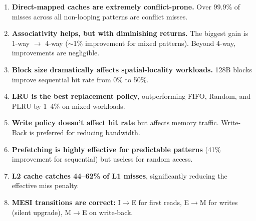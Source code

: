 \documentclass[12pt,a4paper]{article}
\begin{document}
\begin{enumerate}
    \item \textbf{Direct-mapped caches are extremely conflict-prone.} Over 99.9\% of misses across all non-looping patterns are conflict misses.
    \item \textbf{Associativity helps, but with diminishing returns.} The biggest gain is 1-way $\to$ 4-way ($\sim$1\% improvement for mixed patterns). Beyond 4-way, improvements are negligible.
    \item \textbf{Block size dramatically affects spatial-locality workloads.} 128B blocks improve sequential hit rate from 0\% to 50\%.
    \item \textbf{LRU is the best replacement policy}, outperforming FIFO, Random, and PLRU by 1--4\% on mixed workloads.
    \item \textbf{Write policy doesn't affect hit rate} but affects memory traffic. Write-Back is preferred for reducing bandwidth.
    \item \textbf{Prefetching is highly effective for predictable patterns} (41\% improvement for sequential) but useless for random access.
    \item \textbf{L2 cache catches 44--62\% of L1 misses}, significantly reducing the effective miss penalty.
    \item \textbf{MESI transitions are correct:} I$\to$E for first reads, E$\to$M for writes (silent upgrade), M$\to$E on write-back.
\end{enumerate}
\end{document}
